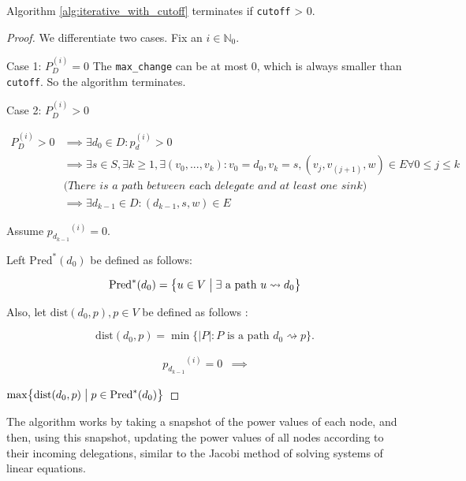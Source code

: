 \begin{lemma}\label{lem:iterative_alg_power_concentrates}
Algorithm \ref{alg:iterative_with_cutoff} terminates if \texttt{cutoff} > 0.
\end{lemma}
\begin{proof} We differentiate two cases. Fix an $i \in \mathbb{N}_0$.

Case 1: $P_D^{(i)} = 0$
The \texttt{max\_change} can be at most 0, which is always smaller than \texttt{cutoff}. So the algorithm terminates.

Case 2: $P_D^{(i)} > 0$

\begin{align*}
P_D^{(i)} > 0 
& \implies \exists d_0 \in D: p_d^{(i)} > 0 \\
& \implies \exists s \in S, \exists k \ge 1, \exists (v_0, ..., v_k): v_0 = d_0, v_k= s, (v_j, v_{(j+1)}, w) \in E \forall 0 \le j \le k \\
&\textit{(There is a path between each delegate and at least one sink)} \\
& \implies \exists d_{k-1} \in D: (d_{k-1}, s, w) \in E
\end{align*}

Assume ${p_{d_{k-1}}}^{(i)} = 0$.

Left $\mathrm{Pred}^*(d_0)$ be defined as follows:

\[
\mathrm{Pred}^*(d_{0})=\bigl\{u \in V \bigm| \exists\text{ a path }u \rightsquigarrow d_{0} \bigr\}
\]

Also, let $\mathrm{dist}(d_{0}, p), p \in V$  be defined as follows :

\[
\mathrm{dist}(d_{0},p) =\min\bigl\{|P| : P\text{ is a path }d_{0}\rightsquigarrow p\bigr\}.
\]

\begin{align*}
{p_{d_{k-1}}}^{(i)} = 0 &\implies 
\end{align*}

$\max\bigl\{\mathrm{dist}(d_0,p)\bigm|p\in \mathrm{Pred}^*(d_0)\bigr\} $



\end{proof}




The algorithm works by taking a snapshot of the power values of each node, and then, using this snapshot, updating the power values of all nodes according to their incoming delegations, similar to the Jacobi method of solving systems of linear equations. 


